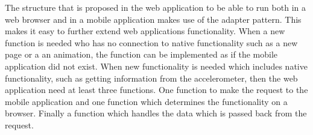 The structure that is proposed in the web application to be able to run both in a web browser and in a mobile application makes use of the adapter pattern. This makes it easy to further extend web applications functionality. When a new function is needed who has no connection to native functionality such as a new page or a an animation, the function can be implemented as if the mobile application did not exist. When new functionality is needed which includes native functionality, such as getting information from the accelerometer, then the web application need at least three functions. One function to make the request to the mobile application and one function which determines the functionality on a browser. Finally a function which handles the data which is passed back from the request. 